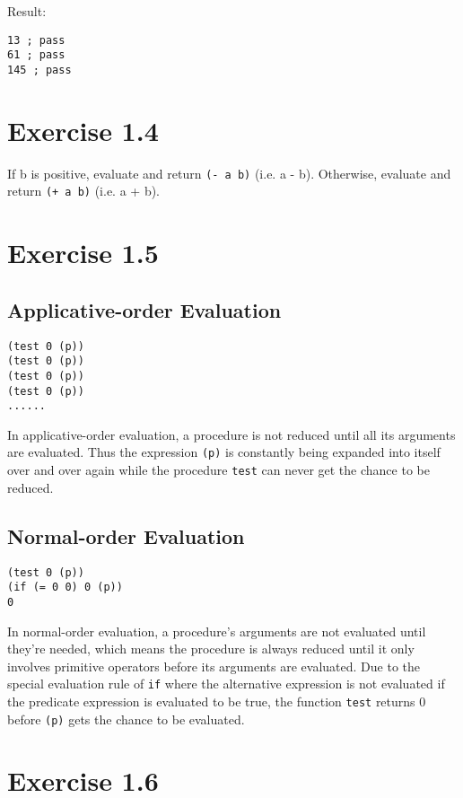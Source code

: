 \documentclass[../main.tex]{subfiles}
\begin{document}
Result:

\begin{lstlisting}
13 ; pass
61 ; pass
145 ; pass
\end{lstlisting}

\section{Exercise 1.4}

If b is positive, evaluate and return \lstinline{(- a b)} (i.e. a - b).
 Otherwise, evaluate and return \lstinline{(+ a b)} (i.e. a + b).

\section{Exercise 1.5}

\subsection*{Applicative-order Evaluation}

\begin{lstlisting}
(test 0 (p))
(test 0 (p))
(test 0 (p))
(test 0 (p))
......
\end{lstlisting}

In applicative-order evaluation, a procedure is not reduced until
 all its arguments are evaluated. Thus the expression \lstinline{(p)}
  is constantly being expanded into itself over and over again while
   the procedure \lstinline{test} can never get the chance to be reduced.

\subsection*{Normal-order Evaluation}

\begin{lstlisting}
(test 0 (p))
(if (= 0 0) 0 (p))
0
\end{lstlisting}

In normal-order evaluation, a procedure's arguments are not evaluated
 until they're needed, which means the procedure is always reduced
 until it only involves primitive operators before its arguments are
 evaluated. Due to the special evaluation rule of \lstinline{if}
 where the alternative expression is not evaluated if the predicate
 expression is evaluated to be true, the function \lstinline{test}
 returns 0 before \lstinline{(p)} gets the chance to be evaluated.

\section{Exercise 1.6}
\end{document}
